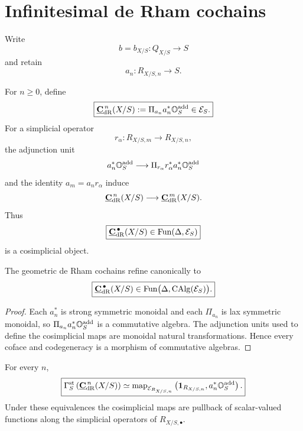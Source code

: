 \section{Infinitesimal de Rham cochains}
\label{sec:cosimplicial-parameterized-de-rham}

Write
\[
    b=b_{X/S}:Q_{X/S}\longrightarrow S
\]
and retain
\[
    a_n:R_{X/S,n}\longrightarrow S.
\]

\begin{definition}
\label{def:degreewise-modal-de-rham-cochains}
For \(n\geq0\), define
\[
\boxed{
    \underline{\mathbf C}_{\mathrm{dR}}^{\,n}(X/S)
    :=
    \Pi_{a_n}a_n^*\mathbb O_S^{\mathrm{add}}
    \in
    \mathcal E_S.
}
\]
For a simplicial operator
\[
    r_\alpha:R_{X/S,m}\longrightarrow R_{X/S,n},
\]
the adjunction unit
\[
    a_n^*\mathbb O_S^{\mathrm{add}}
    \longrightarrow
    \Pi_{r_\alpha}r_\alpha^*a_n^*\mathbb O_S^{\mathrm{add}}
\]
and the identity \(a_m=a_nr_\alpha\) induce
\[
    \underline{\mathbf C}_{\mathrm{dR}}^{\,n}(X/S)
    \longrightarrow
    \underline{\mathbf C}_{\mathrm{dR}}^{\,m}(X/S).
\]
Thus
\[
\boxed{
    \underline{\mathbf C}_{\mathrm{dR}}^{\,\bullet}(X/S)
    \in
    \operatorname{Fun}(\Delta,\mathcal E_S)
}
\]
is a cosimplicial object.
\end{definition}

\begin{proposition}
\label{prop:monadic-de-rham-degreewise-calg}
The geometric de Rham cochains refine canonically to
\[
\boxed{
    \underline{\mathbf C}_{\mathrm{dR}}^{\,\bullet}(X/S)
    \in
    \operatorname{Fun}\bigl(\Delta,\operatorname{CAlg}(\mathcal E_S)\bigr).
}
\]
\end{proposition}

\begin{proof}
Each \(a_n^*\) is strong symmetric monoidal and each \(\Pi_{a_n}\) is lax symmetric monoidal, so
\(\Pi_{a_n}a_n^*\mathbb O_S^{\mathrm{add}}\) is a commutative algebra.  The adjunction units used to define
the cosimplicial maps are monoidal natural transformations.  Hence every coface and codegeneracy is
a morphism of commutative algebras.
\end{proof}

\begin{proposition}
\label{prop:modal-de-rham-mapping-spectrum}
For every \(n\),
\[
\boxed{
    \Gamma_S^{\mathrm{st}}
    \left(
        \underline{\mathbf C}_{\mathrm{dR}}^{\,n}(X/S)
    \right)
    \simeq
    \operatorname{map}_{\mathcal E_{R_{X/S,n}}}
    \left(
        \mathbf 1_{R_{X/S,n}},
        a_n^*\mathbb O_S^{\mathrm{add}}
    \right).
}
\]
Under these equivalences the cosimplicial maps are pullback of scalar-valued functions along the
simplicial operators of \(R_{X/S,\bullet}\).
\end{proposition}

